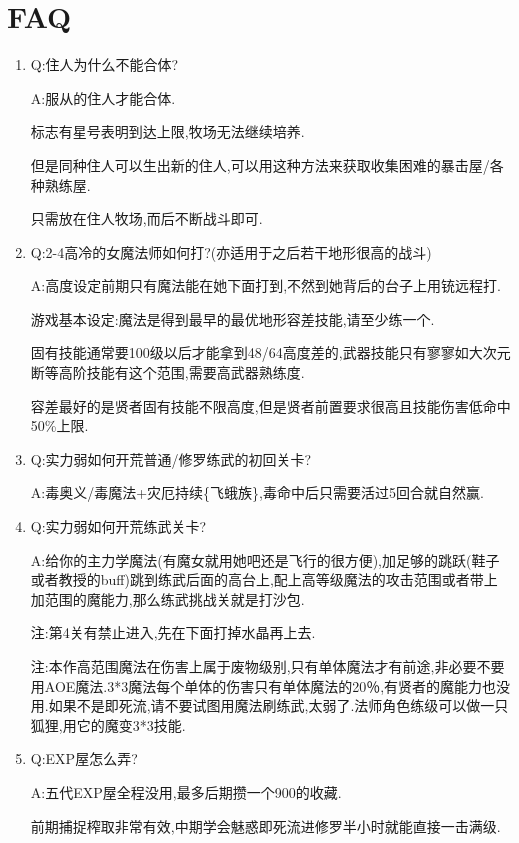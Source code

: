 \newpage

\section{FAQ}

\begin{enumerate}

	\item
	Q:住人为什么不能合体?

	A:服从的住人才能合体.

	标志有星号表明到达上限,牧场无法继续培养.

	但是同种住人可以生出新的住人,可以用这种方法来获取收集困难的暴击屋/各种熟练屋.

	只需放在住人牧场,而后不断战斗即可.

	\item
	Q:2-4高冷的女魔法师如何打?(亦适用于之后若干地形很高的战斗)

	A:高度设定前期只有魔法能在她下面打到,不然到她背后的台子上用铳远程打.

	游戏基本设定:魔法是得到最早的最优地形容差技能,请至少练一个.

	固有技能通常要100级以后才能拿到48/64高度差的,武器技能只有寥寥如大次元断等高阶技能有这个范围,需要高武器熟练度.

	容差最好的是贤者固有技能不限高度,但是贤者前置要求很高且技能伤害低命中50\%上限.

	\item
	Q:实力弱如何开荒普通/修罗练武的{\color{red}初回}关卡?

	A:毒奥义/毒魔法+灾厄持续\{飞蛾族\},毒命中后只需要活过5回合就自然赢.

	\item
	Q:实力弱如何开荒练武关卡?

	A:给你的主力学魔法(有魔女就用她吧还是飞行的很方便),加足够的跳跃(鞋子或者教授的buff)跳到练武后面的高台上,配上高等级魔法的攻击范围或者带上加范围的魔能力,那么练武挑战关就是打沙包.

	注:第4关有禁止进入,先在下面打掉水晶再上去.

	注:本作高范围魔法在伤害上属于废物级别,只有单体魔法才有前途,非必要不要用AOE魔法.3*3魔法每个单体的伤害只有单体魔法的20％,有贤者的魔能力也没用.如果不是即死流,请不要试图用魔法刷练武,太弱了.法师角色练级可以做一只狐狸,用它的魔变3*3技能.

	\item
	Q:EXP屋怎么弄?

	A:五代EXP屋全程没用,最多后期攒一个900的收藏.

	前期捕捉榨取非常有效,中期学会魅惑即死流进修罗半小时就能直接一击满级.


\end{enumerate}
